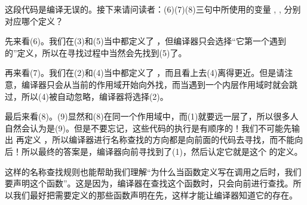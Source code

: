 这段代码是编译无误的。接下来请问读者：(6)(7)(8)三句中所使用的变量 \lstinline@c@, \lstinline@b@, \lstinline@a@ 分别对应哪个定义？\par
先来看(6)。我们在(3)和(5)当中都定义了 \lstinline@c@，但编译器只会选择``它第一个遇到的''定义，所以在寻找过程中当然会先找到(5)了。\par
再来看(7)。我们在(2)和(4)当中都定义了 \lstinline@b@，而且看上去(4)离得更近。但是请注意，编译器只会从当前的作用域开始向外找，而当遇到一个内层作用域时就会跳过，所以(4)被自动忽略，编译器将选择(2)。\par
最后来看(8)。(9)显然和(8)在同一个作用域中，而(1)就要远一层了，所以很多人自然会认为是(9)。但是不要忘记，这些代码的执行是有顺序的！我们不可能先输出 \lstinline@a@ 再定义 \lstinline@a@，所以编译器进行名称查找的方向都是向前面的代码去寻找，而不能向后！所以最终的答案是，编译器向前寻找到了(1)，然后认定它就是这个 \lstinline@a@ 的定义。\par
这样的名称查找规则也能帮助我们理解``为什么当函数定义写在调用之后时，我们要声明这个函数''。这是因为，编译器在查找这个函数时，只会向前进行查找。所以我们最好把需要定义的那些函数声明在先，这样才能让编译器知道它的存在。\par
